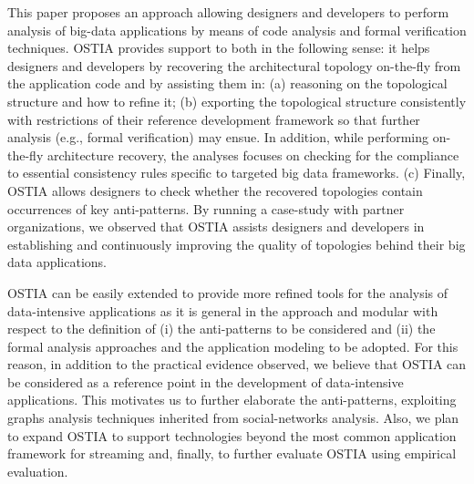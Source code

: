 \documentclass[smallextended]{svjour3}       %
\begin{document}
This paper proposes an approach allowing designers and developers to perform analysis of big-data applications by means of code analysis and formal verification techniques.
OSTIA provides support to both in the following sense:
it helps designers and developers by recovering the architectural topology on-the-fly from the application code and by assisting them in: 
(a) reasoning on the topological structure and how to refine it; 
(b) exporting the topological structure consistently with restrictions of their reference development framework so that further analysis (e.g., formal verification) may ensue. In addition, while performing on-the-fly architecture recovery, the analyses focuses on checking for the compliance to essential consistency rules specific to targeted big data frameworks. 
(c) Finally, OSTIA allows designers to check whether the recovered topologies contain occurrences of key anti-patterns. By running a case-study with partner organizations, we observed that OSTIA assists designers and developers in establishing and continuously improving the quality of topologies behind their big data applications. 

OSTIA can be easily extended to provide more refined tools for the analysis of data-intensive applications as it is general in the approach and modular with respect to the definition of (i) the anti-patterns to be considered and (ii) the formal analysis approaches and the application modeling to be adopted.
For this reason, in addition to the practical evidence observed,  we believe that OSTIA can be considered as a reference point in the development of data-intensive applications.
This motivates us to further elaborate the anti-patterns, 
exploiting graphs analysis techniques inherited from social-networks analysis. Also, we plan to expand OSTIA to support technologies beyond the most common application framework for streaming %
and, finally, to further evaluate OSTIA using empirical evaluation.

\end{document}
